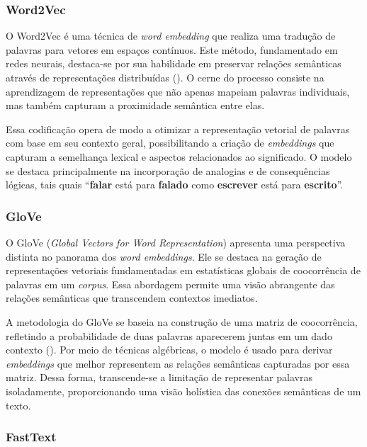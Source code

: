 \subsubsection{Word2Vec}

O Word2Vec é uma técnica de \textit{word embedding} que realiza uma tradução de palavras para vetores em espaços contínuos. Este método, fundamentado em redes neurais, destaca-se por sua habilidade em preservar relações semânticas através de representações distribuídas (\cite{mikolov-etal-2013-linguistic}). O cerne do processo consiste na aprendizagem de representações que não apenas mapeiam palavras individuais, mas também capturam a proximidade semântica entre elas.

Essa codificação opera de modo a otimizar a representação vetorial de palavras com base em seu contexto geral, possibilitando a criação de \textit{embeddings} que capturam a semelhança lexical e aspectos relacionados ao significado. O modelo se destaca principalmente na incorporação de analogias e de consequências lógicas, tais quais ``\textbf{falar} está para \textbf{falado} como \textbf{escrever} está para \textbf{escrito}''.

\subsubsection{GloVe}

O GloVe (\textit{Global Vectors for Word Representation}) apresenta uma perspectiva distinta no panorama dos \textit{word embeddings}. Ele se destaca na geração de representações vetoriais fundamentadas em estatísticas globais de coocorrência de palavras em um \textit{corpus}. Essa abordagem permite uma visão abrangente das relações semânticas que transcendem contextos imediatos.

A metodologia do GloVe se baseia na construção de uma matriz de coocorrência, refletindo a probabilidade de duas palavras aparecerem juntas em um dado contexto (\cite{pennington-etal-2014-glove}). Por meio de técnicas algébricas, o modelo é usado para derivar \textit{embeddings} que melhor representem as relações semânticas capturadas por essa matriz. Dessa forma, transcende-se a limitação de representar palavras isoladamente, proporcionando uma visão holística das conexões semânticas de um texto.

\subsubsection{FastText}

